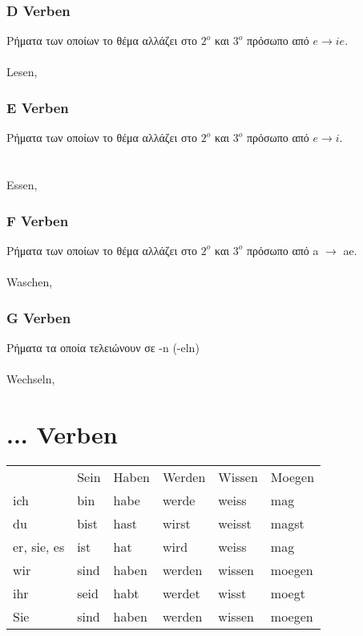\begin{appendix}
 \subsubsection{D Verben}
 Ρήματα των οποίων το θέμα αλλάζει στο $2^o$ και $3^ο$ πρόσωπο από $e \rightarrow ie$. \\
  \\
 
 \gls{Lesen}, 
 
 \subsubsection{E Verben}
 Ρήματα των οποίων το θέμα αλλάζει στο $2^o$ και $3^ο$ πρόσωπο από $e \rightarrow i$. \\
  \\
  \\
 
 \gls{Essen}, 
 
 \subsubsection{F Verben}
 Ρήματα των οποίων το θέμα αλλάζει στο $2^o$ και $3^ο$ πρόσωπο από a $\rightarrow$ ae. \\
  \\
 
 \gls{Waschen}, 
 
 \subsubsection{G Verben}
 Ρήματα τα οποία τελειώνουν σε -n (-eln) \\
  \\
 \gls{Wechseln}, 
 
 \section{ ... Verben}
 \begin{tabular}{l l l l l l}
  & \gls{Sein} & \gls{Haben} & \gls{Werden} & \gls{Wissen} & \gls{Moegen} \\
  ich & bin & habe & werde & weiss & mag \\
  du & bist & hast & wirst & weisst & magst \\
  er, sie, es & ist & hat & wird & weiss & mag \\
  wir & sind & haben & werden & wissen & moegen \\
  ihr & seid & habt & werdet & wisst & moegt \\
  Sie & sind & haben & werden & wissen & moegen \\
 \end{tabular}


\end{appendix}
